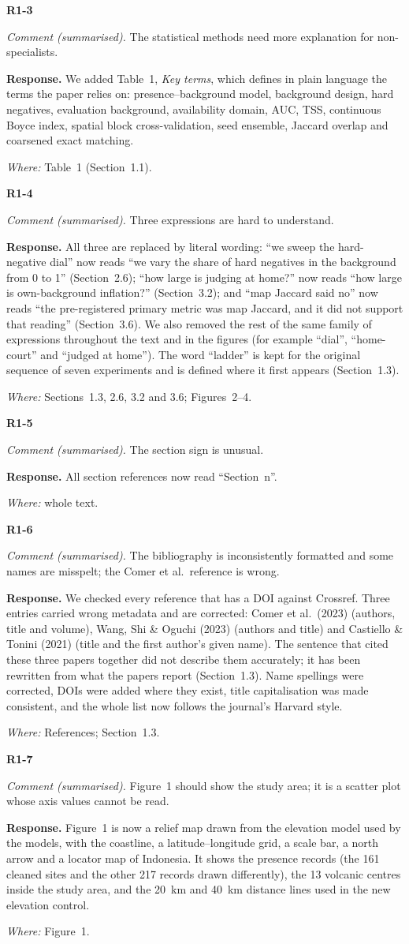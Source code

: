 \documentclass[11pt,a4paper]{article}
\newcommand{\comment}[1]{\par\noindent\textit{Comment (summarised).} #1\par}
\newcommand{\response}{\par\noindent\textbf{Response.} }
\newcommand{\where}[1]{\par\noindent\textit{Where:} #1\par\medskip}
\begin{document}
\textbf{R1-3}
\comment{The statistical methods need more explanation for non-specialists.}
\response We added Table~1, \emph{Key terms}, which defines in plain language the terms the paper relies on:
presence--background model, background design, hard negatives, evaluation background, availability domain, AUC, TSS,
continuous Boyce index, spatial block cross-validation, seed ensemble, Jaccard overlap and coarsened exact matching.
\where{Table~1 (Section~1.1).}

\textbf{R1-4}
\comment{Three expressions are hard to understand.}
\response All three are replaced by literal wording: ``we sweep the hard-negative dial'' now reads ``we vary the share
of hard negatives in the background from 0 to 1'' (Section~2.6); ``how large is judging at home?'' now reads ``how large
is own-background inflation?'' (Section~3.2); and ``map Jaccard said no'' now reads ``the pre-registered primary metric
was map Jaccard, and it did not support that reading'' (Section~3.6). We also removed the rest of the same family of
expressions throughout the text and in the figures (for example ``dial'', ``home-court'' and ``judged at home''). The
word ``ladder'' is kept for the original sequence of seven experiments and is defined where it first appears
(Section~1.3).
\where{Sections~1.3, 2.6, 3.2 and 3.6; Figures~2--4.}

\textbf{R1-5}
\comment{The section sign is unusual.}
\response All section references now read ``Section~n''.
\where{whole text.}

\textbf{R1-6}
\comment{The bibliography is inconsistently formatted and some names are misspelt; the Comer et al.\ reference is
wrong.}
\response We checked every reference that has a DOI against Crossref. Three entries carried wrong metadata and are
corrected: Comer et al.\ (2023) (authors, title and volume), Wang, Shi \& Oguchi (2023) (authors and title) and
Castiello \& Tonini (2021) (title and the first author's given name). The sentence that cited these three papers
together did not describe them accurately; it has been rewritten from what the papers report (Section~1.3). Name
spellings were corrected, DOIs were added where they exist, title capitalisation was made consistent, and the whole list
now follows the journal's Harvard style.
\where{References; Section~1.3.}

\textbf{R1-7}
\comment{Figure~1 should show the study area; it is a scatter plot whose axis values cannot be read.}
\response Figure~1 is now a relief map drawn from the elevation model used by the models, with the coastline, a
latitude--longitude grid, a scale bar, a north arrow and a locator map of Indonesia. It shows the presence records (the
161 cleaned sites and the other 217 records drawn differently), the 13 volcanic centres inside the study area, and the
20~km and 40~km distance lines used in the new elevation control.
\where{Figure~1.}
\end{document}
